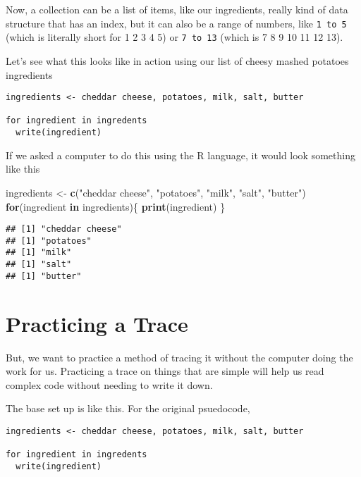 \documentclass[
]{book}
\newenvironment{Shaded}{\begin{snugshade}}{\end{snugshade}}
\newcommand{\ControlFlowTok}[1]{\textcolor[rgb]{0.13,0.29,0.53}{\textbf{#1}}}
\newcommand{\FunctionTok}[1]{\textcolor[rgb]{0.13,0.29,0.53}{\textbf{#1}}}
\newcommand{\NormalTok}[1]{#1}
\newcommand{\OtherTok}[1]{\textcolor[rgb]{0.56,0.35,0.01}{#1}}
\newcommand{\StringTok}[1]{\textcolor[rgb]{0.31,0.60,0.02}{#1}}
\begin{document}
Now, a collection can be a list of items, like our ingredients, really kind of data structure that has an index, but it can also be a range of numbers, like \texttt{1\ to\ 5} (which is literally short for 1 2 3 4 5) or \texttt{7\ to\ 13} (which is 7 8 9 10 11 12 13).

Let's see what this looks like in action using our list of cheesy mashed potatoes ingredients

\begin{verbatim}
ingredients <- cheddar cheese, potatoes, milk, salt, butter

for ingredient in ingredents
  write(ingredient)
\end{verbatim}

If we asked a computer to do this using the R language, it would look something like this

\begin{Shaded}
\begin{Highlighting}[]
\NormalTok{ingredients }\OtherTok{\textless{}{-}} \FunctionTok{c}\NormalTok{(}\StringTok{"cheddar cheese"}\NormalTok{, }\StringTok{"potatoes"}\NormalTok{, }\StringTok{"milk"}\NormalTok{, }\StringTok{"salt"}\NormalTok{, }\StringTok{"butter"}\NormalTok{)}
\ControlFlowTok{for}\NormalTok{(ingredient }\ControlFlowTok{in}\NormalTok{ ingredients)\{}
  \FunctionTok{print}\NormalTok{(ingredient)}
\NormalTok{\}}
\end{Highlighting}
\end{Shaded}

\begin{verbatim}
## [1] "cheddar cheese"
## [1] "potatoes"
## [1] "milk"
## [1] "salt"
## [1] "butter"
\end{verbatim}

\section{Practicing a Trace}\label{practicing-a-trace}

But, we want to practice a method of tracing it without the computer doing the work for us. Practicing a trace on things that are simple will help us read complex code without needing to write it down.

The base set up is like this. For the original psuedocode,

\begin{verbatim}
ingredients <- cheddar cheese, potatoes, milk, salt, butter

for ingredient in ingredents
  write(ingredient)
\end{verbatim}
\end{document}
